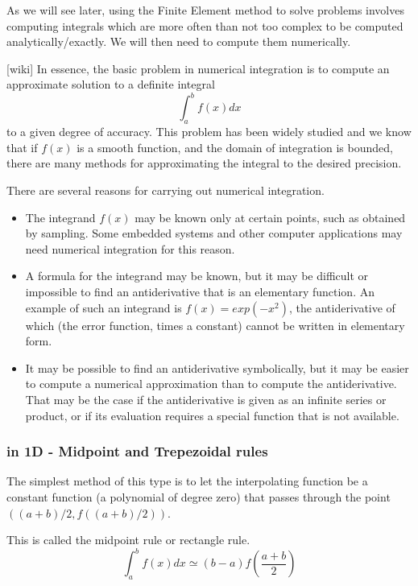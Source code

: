 As we will see later, using the Finite Element method to solve problems involves computing integrals which are more often than not too complex to be computed analytically/exactly. We will then need to compute them numerically.

[wiki] In essence, 
the basic problem in numerical integration is to compute an approximate solution to a definite integral
\[
\int_a^b f(x) dx
\]
to a given degree of accuracy.
This problem has been widely studied and we know that 
if $f(x)$ is a smooth function, and the domain of integration is bounded, there are many methods for approximating the integral to the desired precision.

There are several reasons for carrying out numerical integration.
\begin{itemize}
\item The integrand $f(x)$ may be known only at certain points, such as obtained by sampling. Some embedded systems and other computer applications may need numerical integration for this reason.
\item A formula for the integrand may be known, but it may be difficult or impossible to find an antiderivative that is an elementary function. An example of such an integrand is $f(x)=exp(-x^2)$, the antiderivative of which (the error function, times a constant) cannot be written in elementary form.
\item It may be possible to find an antiderivative symbolically, but it may be easier to compute a numerical approximation than to compute the antiderivative. That may be the case if the antiderivative is given as an infinite series or product, or if its evaluation requires a special function that is not available.
\end{itemize}

\subsubsection{in 1D - Midpoint and Trepezoidal rules  \label{sec:quad1D}}

The simplest method of this type is to let the interpolating function be a constant function (a polynomial of degree zero) that passes through the point $((a+b)/2, f((a+b)/2))$.

This is called the midpoint rule  or rectangle rule. 
\[
\int_a^b f(x)dx \simeq (b-a) f(\frac{a+b}{2})
\]


